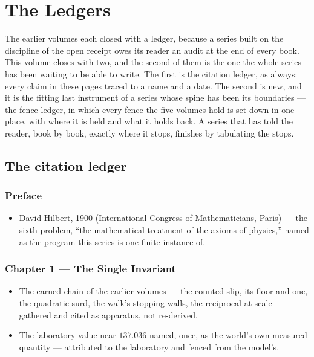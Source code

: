 \chapter{The Ledgers}

The earlier volumes each closed with a ledger, because a series built on
the discipline of the open receipt owes its reader an audit at the end of
every book. This volume closes with two, and the second of them is the one
the whole series has been waiting to be able to write. The first is the
citation ledger, as always: every claim in these pages traced to a name and
a date. The second is new, and it is the fitting last instrument of a
series whose spine has been its boundaries --- the fence ledger, in which
every fence the five volumes hold is set down in one place, with where it
is held and what it holds back. A series that has told the reader, book by
book, exactly where it stops, finishes by tabulating the stops.

\section*{The citation ledger}

\subsection*{Preface}
\begin{itemize}
\item David Hilbert, 1900 (International Congress of Mathematicians, Paris)
--- the sixth problem, ``the mathematical treatment of the axioms of
physics,'' named as the program this series is one finite instance of.
\end{itemize}

\subsection*{Chapter 1 --- The Single Invariant}
\begin{itemize}
\item The earned chain of the earlier volumes --- the counted slip, its
floor-and-one, the quadratic surd, the walk's stopping walls, the
reciprocal-at-scale --- gathered and cited as apparatus, not re-derived.
\item The laboratory value near $137.036$ named, once, as the world's own
measured quantity --- attributed to the laboratory and fenced from the
model's.
\end{itemize}

